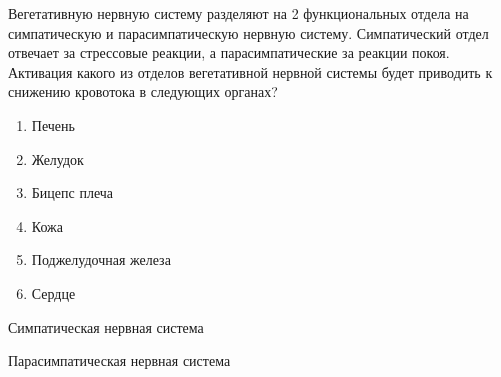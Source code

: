 
Вегетативную нервную систему разделяют на 2 функциональных отдела на симпатическую и 
парасимпатическую нервную систему. Симпатический отдел отвечает за стрессовые реакции, 
а парасимпатические за реакции покоя. Активация какого из отделов вегетативной нервной 
системы будет приводить к снижению кровотока в следующих органах?

\begin{enumerate}
    \item Печень
    \item Желудок
    \item Бицепс плеча
    \item Кожа
    \item Поджелудочная железа
    \item Сердце
\end{enumerate}
    
Симпатическая нервная система

Парасимпатическая нервная система

\explanationSection

